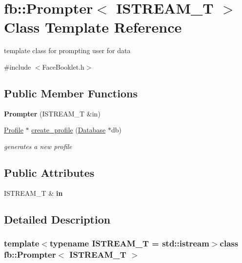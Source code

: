 \hypertarget{classfb_1_1_prompter}{\section{fb\+:\+:Prompter$<$ I\+S\+T\+R\+E\+A\+M\+\_\+\+T $>$ Class Template Reference}
\label{classfb_1_1_prompter}
}


template class for prompting user for data  




{\ttfamily \#include $<$Face\+Booklet.\+h$>$}

\subsection*{Public Member Functions}
\begin{DoxyCompactItemize}
\item 
\hypertarget{classfb_1_1_prompter_af0270c9ee1234d8ed892e4137c3e225a}{{\bfseries Prompter} (I\+S\+T\+R\+E\+A\+M\+\_\+\+T \&in)}\label{classfb_1_1_prompter_af0270c9ee1234d8ed892e4137c3e225a}

\item 
\hyperlink{classfb_1_1_profile}{Profile} $\ast$ \hyperlink{classfb_1_1_prompter_acc93a31b8d47be2358ff044cb2ee9521}{create\+\_\+profile} (\hyperlink{classfb_1_1_database}{Database} $\ast$db)
\begin{DoxyCompactList}\small\item\em generates a new profile \end{DoxyCompactList}\end{DoxyCompactItemize}
\subsection*{Public Attributes}
\begin{DoxyCompactItemize}
\item 
\hypertarget{classfb_1_1_prompter_a2f77a9922842a56959b65fecc5d11e0a}{I\+S\+T\+R\+E\+A\+M\+\_\+\+T \& {\bfseries in}}\label{classfb_1_1_prompter_a2f77a9922842a56959b65fecc5d11e0a}

\end{DoxyCompactItemize}


\subsection{Detailed Description}
\subsubsection*{template$<$typename I\+S\+T\+R\+E\+A\+M\+\_\+\+T = std\+::istream$>$class fb\+::\+Prompter$<$ I\+S\+T\+R\+E\+A\+M\+\_\+\+T $>$}

